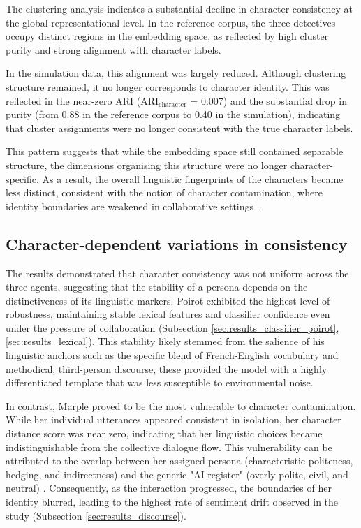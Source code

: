 \documentclass{article}
\begin{document}
The clustering analysis indicates a substantial decline in character consistency at the global representational level. In the reference corpus, the three detectives occupy distinct regions in the embedding space, as reflected by high cluster purity and strong alignment with character labels. 

In the simulation data, this alignment was largely reduced. Although clustering structure remained, it no longer corresponds to character identity. This was reflected in the near-zero ARI ($\mathrm{ARI_{character}}$ = 0.007) and the substantial drop in purity (from 0.88 in the reference corpus to 0.40 in the simulation), indicating that cluster assignments were no longer consistent with the true character labels.

This pattern suggests that while the embedding space still contained separable structure, the dimensions organising this structure were no longer character-specific. As a result, the overall linguistic fingerprints of the characters became less distinct, consistent with the notion of character contamination, where identity boundaries are weakened in collaborative settings \citep{choi2024examining, bao2026eval4sim}.

\subsection{Character-dependent variations in consistency}

The results demonstrated that character consistency was not uniform across the three agents, suggesting that the stability of a persona depends on the distinctiveness of its linguistic markers. Poirot exhibited the highest level of robustness, maintaining stable lexical features and classifier confidence even under the pressure of collaboration (Subsection \ref{sec:results_classifier_poirot}, \ref{sec:results_lexical}). This stability likely stemmed from the salience of his linguistic anchors such as the specific blend of French-English vocabulary and methodical, third-person discourse, these provided the model with a highly differentiated template that was less susceptible to environmental noise.

In contrast, Marple proved to be the most vulnerable to character contamination. While her individual utterances appeared consistent in isolation, her character distance score was near zero, indicating that her linguistic choices became indistinguishable from the collective dialogue flow. This vulnerability can be attributed to the overlap between her assigned persona (characteristic politeness, hedging, and indirectness) and the generic "AI register" (overly polite, civil, and neutral) \citep{shanahan2023role}. Consequently, as the interaction progressed, the boundaries of her identity blurred, leading to the highest rate of sentiment drift observed in the study (Subsection \ref{sec:results_discourse}).
\end{document}
